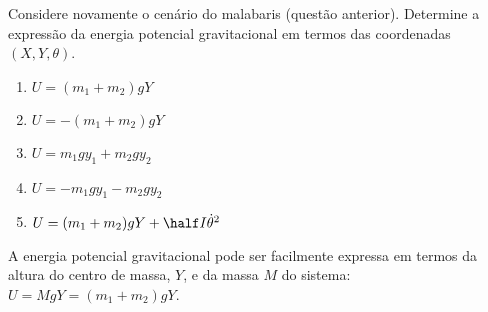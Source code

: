 \begin{question}
  	Considere novamente o cenário do malabaris (questão anterior).
  	Determine a expressão da energia potencial gravitacional em termos das coordenadas $(X,Y,\theta)$.

  	\begin{enumerate}
  		\item $U = (m_1 + m_2)gY$ \rightanswer
  		\item $U = -(m_1 + m_2)gY$
  		\item $U = m_1gy_1 + m_2gy_2$
  		\item $U = - m_1gy_1 - m_2gy_2$
  		\item $U = (m_1 + m_2)gY + \half I \dot\theta^2$
  	\end{enumerate}

    \begin{solution}
      A energia potencial gravitacional pode ser facilmente expressa em termos da altura do centro de massa, $Y$, e da massa $M$ do sistema: $U = MgY = (m_1 + m_2)gY$.
    \end{solution}
\end{question}